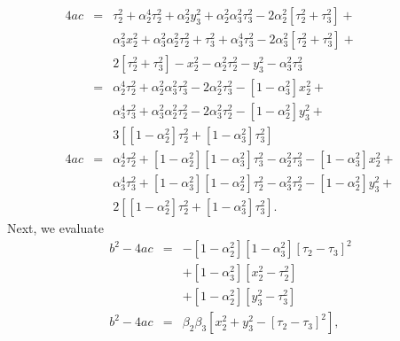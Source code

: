 \documentclass[twocolumn]{article}
\begin{document}
\begin{eqnarray}
   \nonumber
   4ac &=&
           \tau_2^2 + \alpha_2^4 \tau_2^2 + \alpha_2^2 y_3^2 + \alpha_2^2
           \alpha_3^2 \tau_3^2 - 2 \alpha_2^2 \left[\tau_2^2 + \tau_3^2\right]
           +\\
   \nonumber
   &&
           \alpha_3^2 x_2^2 + \alpha_3^2 \alpha_2^2 \tau_2^2 + \tau_3^2 +
           \alpha_3^4 \tau_3^2 - 2 \alpha_3^2 \left[\tau_2^2 + \tau_3^2\right]
           +\\
   \nonumber
   &&
           2 \left[\tau_2^2 + \tau_3^2\right] - x_2^2 - \alpha_2^2 \tau_2^2 -
           y_3^2 - \alpha_3^2 \tau_3^2\\[5pt]
   \nonumber
   &=&
           \alpha_2^4 \tau_2^2 + \alpha_2^2 \alpha_3^2 \tau_3^2 - 2 \alpha_2^2
           \tau_3^2 - \left[1 - \alpha_3^2\right] x_2^2 +\\
   \nonumber
   &&
           \alpha_3^4 \tau_3^2 + \alpha_3^2 \alpha_2^2 \tau_2^2 - 2 \alpha_3^2
           \tau_2^2 - \left[1 - \alpha_2^2\right] y_3^2 +\\
   \nonumber
   &&
           3 \left[\left[1 - \alpha_2^2\right]\tau_2^2 + \left[1 -
           \alpha_3^2\right] \tau_3^2\right]\\[5pt]
   \nonumber
   4ac &=&
           \alpha_2^4 \tau_2^2 + \left[1 - \alpha_2^2\right] \left[1 -
           \alpha_3^2\right] \tau_3^2 - \alpha_2^2\tau_3^2 - \left[1 -
           \alpha_3^2\right] x_2^2 +\\
   \nonumber
   &&
           \alpha_3^4 \tau_3^2 + \left[1 - \alpha_3^2\right] \left[1 -
           \alpha_2^2\right] \tau_2^2 - \alpha_3^2 \tau_2^2 - \left[1 -
           \alpha_2^2\right] y_3^2 +\\
   &&
           2 \left[\left[1 - \alpha_2^2\right]\tau_2^2 + \left[1 -
           \alpha_3^2\right] \tau_3^2\right].
\end{eqnarray}
Next, we evaluate
\begin{eqnarray}
   \nonumber
   b^2 - 4ac &=& - \left[1 - \alpha_2^2\right] \left[1 - \alpha_3^2\right]
                   \left[\tau_2 - \tau_3\right]^2\\
   \nonumber
              && + \left[1 - \alpha_3^2\right] \left[x_2^2 - \tau_2^2\right]\\
   \nonumber
              && + \left[1 - \alpha_2^2\right] \left[y_3^2 -
                 \tau_3^2\right]\\[5pt]
   b^2 - 4ac &=& \beta_2 \beta_3 \left[x_2^2 + y_3^2 - \left[\tau_2 -
                 \tau_3\right]^2\right],
\end{eqnarray}
\end{document}

